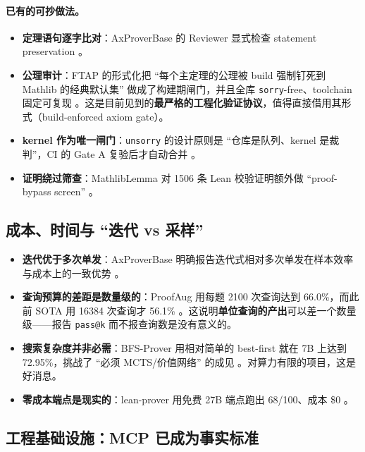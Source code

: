 \documentclass[UTF8,a4paper,11pt,fontset=windows]{ctexart}
\newcommand{\code}[1]{\texttt{#1}}
\begin{document}
\paragraph{已有的可抄做法。}
\begin{itemize}
  \item \textbf{定理语句逐字比对}：AxProverBase 的 Reviewer 显式检查 statement preservation \cite{axprover}。
  \item \textbf{公理审计}：FTAP 的形式化把 ``每个主定理的公理被 build 强制钉死到 Mathlib 的经典默认集'' 做成了构建期闸门，并且全库 \code{sorry}-free、toolchain 固定可复现 \cite{ftap}。这是目前见到的\textbf{最严格的工程化验证协议}，值得直接借用其形式（build-enforced axiom gate）。
  \item \textbf{kernel 作为唯一闸门}：\code{unsorry} 的设计原则是 ``仓库是队列、kernel 是裁判''，CI 的 Gate A 复验后才自动合并 \cite{unsorry}。
  \item \textbf{证明绕过筛查}：MathlibLemma 对 1506 条 Lean 校验证明额外做 ``proof-bypass screen'' \cite{mathliblemma}。
\end{itemize}

\subsection{成本、时间与 ``迭代 vs 采样''}

\begin{itemize}
  \item \textbf{迭代优于多次单发}：AxProverBase 明确报告迭代式相对多次单发在样本效率与成本上的一致优势 \cite{axprover}。
  \item \textbf{查询预算的差距是数量级的}：ProofAug 用每题 2100 次查询达到 66.0\%，而此前 SOTA 用 16384 次查询才 56.1\% \cite{proofaug}。这说明\textbf{单位查询的产出}可以差一个数量级——报告 \code{pass@k} 而不报查询数是没有意义的。
  \item \textbf{搜索复杂度并非必需}：BFS-Prover 用相对简单的 best-first 就在 7B 上达到 72.95\%，挑战了 ``必须 MCTS/价值网络'' 的成见 \cite{bfsprover}。对算力有限的项目，这是好消息。
  \item \textbf{零成本端点是现实的}：lean-prover 用免费 27B 端点跑出 68/100、成本 \$0 \cite{leanproverrepo}。
\end{itemize}

\subsection{工程基础设施：MCP 已成为事实标准}
\end{document}
